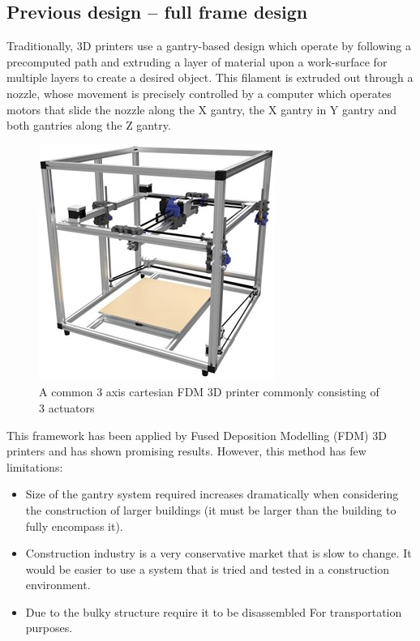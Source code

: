 \documentclass{UoNMCHA}
\numberwithin{equation}{section}
\begin{document}
\subsection*{Previous design – full frame design}
Traditionally, 3D printers use a gantry-based design which operate by following a precomputed path and extruding a layer of material upon a work-surface for multiple layers to create a desired object. This filament is extruded out through a nozzle, whose movement is precisely controlled by a computer which operates motors that slide the nozzle along the X gantry, the X gantry in Y gantry and both gantries along the Z gantry. 

\begin{figure}[H]
	\begin{center}
		\includegraphics[width=.5\linewidth]{figs/Picture1}
		\caption{A  common 3 axis cartesian FDM 3D printer commonly consisting of 3 actuators}
		\label{figs/Picture1}
	\end{center}
\end{figure}
	
This framework has been applied by Fused Deposition Modelling (FDM) 3D printers and has shown promising results.
However, this method has few limitations:

\begin{itemize}
	\item Size of the gantry system required increases dramatically when considering the construction of larger buildings (it must be larger than the building to fully encompass it).
	\item Construction industry is a very conservative market that is slow to change. It would be easier to use a system that is tried and tested in a construction environment.
	\item Due to the bulky structure require it to be disassembled For transportation purposes.
	
\end{itemize}
\end{document}
